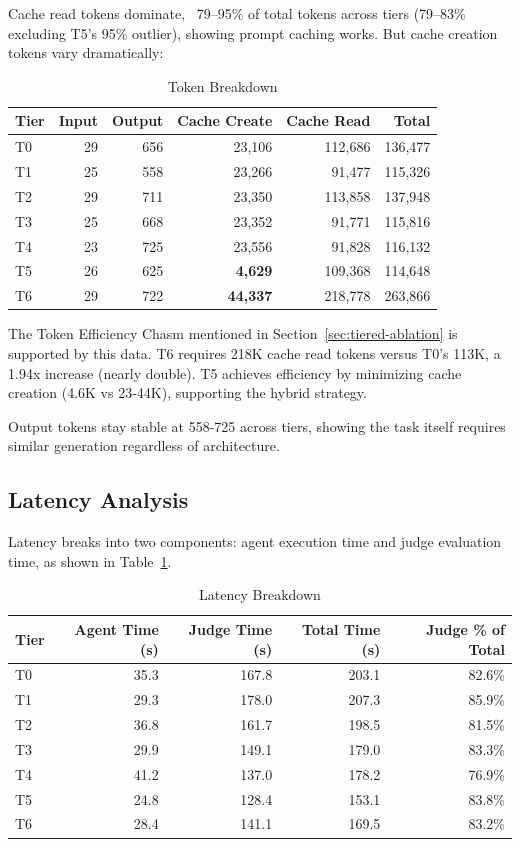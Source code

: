 \documentclass[11pt]{article}
\begin{document}
Cache read tokens dominate, ~79--95\% of total tokens across tiers (79--83\% excluding T5's 95\% outlier), showing
prompt caching works. But cache creation tokens vary dramatically:

\begin{table}[htbp]
\centering
\caption{Token Breakdown}
\begin{tabular}{lrrrrr}
\toprule
Tier & Input & Output & Cache Create & Cache Read & Total \\
\midrule
T0 & 29 & 656 & 23,106 & 112,686 & 136,477 \\
T1 & 25 & 558 & 23,266 & 91,477 & 115,326 \\
T2 & 29 & 711 & 23,350 & 113,858 & 137,948 \\
T3 & 25 & 668 & 23,352 & 91,771 & 115,816 \\
T4 & 23 & 725 & 23,556 & 91,828 & 116,132 \\
T5 & 26 & 625 & \textbf{4,629} & 109,368 & 114,648 \\
T6 & 29 & 722 & \textbf{44,337} & 218,778 & 263,866 \\
\bottomrule
\end{tabular}
\end{table}


The Token Efficiency Chasm mentioned in Section~\ref{sec:tiered-ablation} is supported by this data. T6 requires 218K cache read tokens versus T0's 113K, a 1.94x
increase (nearly double). T5 achieves efficiency by minimizing cache creation
(4.6K vs 23-44K), supporting the hybrid strategy.

Output tokens stay stable at 558-725 across tiers, showing the task itself
requires similar generation regardless of architecture.

\subsection{Latency Analysis}

Latency breaks into two components: agent execution time and judge evaluation
time, as shown in Table~\ref{tab:latency-breakdown}.

\begin{table}[htbp]
\centering
\caption{Latency Breakdown}
\label{tab:latency-breakdown}
\begin{tabular}{lrrrr}
\toprule
Tier & Agent Time (s) & Judge Time (s) & Total Time (s) & Judge \% of Total \\
\midrule
T0 & 35.3 & 167.8 & 203.1 & 82.6\% \\
T1 & 29.3 & 178.0 & 207.3 & 85.9\% \\
T2 & 36.8 & 161.7 & 198.5 & 81.5\% \\
T3 & 29.9 & 149.1 & 179.0 & 83.3\% \\
T4 & 41.2 & 137.0 & 178.2 & 76.9\% \\
T5 & 24.8 & 128.4 & 153.1 & 83.8\% \\
T6 & 28.4 & 141.1 & 169.5 & 83.2\% \\
\bottomrule
\end{tabular}
\end{table}
\end{document}
